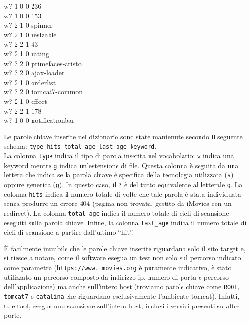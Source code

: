 \documentclass{article}
\begin{document}
\begin{itemize}
\begin{small}
\begin{minipage}{0.47\textwidth}
w? 1 0 0 236\\
w? 1 0 0 153\\
w? 2 1 0 spinner\\
w? 2 1 0 resizable\\
w? 2 2 1 43\\
w? 2 1 0 rating\\
w? 3 2 0 primefaces-aristo\\
w? 3 2 0 ajax-loader\\
w? 2 1 0 orderlist\\
w? 3 2 0 tomcat7-common\\
w? 2 1 0 effect\\
w? 2 2 1 178\\
w? 1 0 0 notificationbar\\
\end{minipage}
\end{small} 

Le parole chiave inserite nel dizionario sono state mantenute secondo il seguente schema: {\tt type hits total\_age last\_age keyword}.\\
La colonna {\tt type} indica il tipo di parola inserita nel vocabolario: {\tt w} indica una keyword mentre {\tt g} indica un'estensione di file. Questa colonna è seguita da una lettera che indica se la parola chiave è specifica della tecnologia utilizzata ({\tt s}) oppure generica ({\tt g}).
In questo caso, il {\tt ?} è del tutto equivalente al letterale {\tt g}.
La colonna {\tt hits} indica il numero totale di volte che tale parola è stata individuata senza produrre un errore 404 (pagina non trovata, gestito da iMovies con un redirect).
La colonna {\tt total\_age} indica il numero totale di cicli di scansione eseguiti sulla parola chiave.
Infine, la colonna {\tt last\_age} indica il numero totale di cicli di scansione a partire dall'ultimo ``hit''.

\`E facilmente intuibile che le parole chiave inserite riguardano solo il sito target e, si riesce a notare, come il software esegua un test non solo sul percorso indicato come parametro ({\tt https://www.imovies.org} è puramente indicativo, è stato utilizzato un percorso composto da indirizzo ip, numero di porta e percorso dell'applicazione) ma anche sull'intero host (troviamo parole chiave come {\tt ROOT}, {\tt tomcat7} o {\tt catalina} che riguardano esclusivamente l'ambiente tomcat). Infatti, tale tool, esegue una scansione sull'intero host, inclusi i servizi presenti su altre porte.


\end{itemize}
\end{document}
